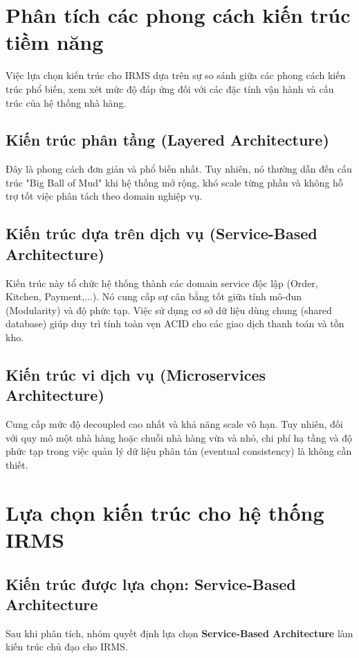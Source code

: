 \section{Phân tích các phong cách kiến trúc tiềm năng}

Việc lựa chọn kiến trúc cho IRMS dựa trên sự so sánh giữa các phong cách kiến trúc phổ biến, xem xét mức độ đáp ứng đối với các đặc tính vận hành và cấu trúc của hệ thống nhà hàng.

\subsection{Kiến trúc phân tầng (Layered Architecture)}
Đây là phong cách đơn giản và phổ biến nhất. Tuy nhiên, nó thường dẫn đến cấu trúc "Big Ball of Mud" khi hệ thống mở rộng, khó scale từng phần và không hỗ trợ tốt việc phân tách theo domain nghiệp vụ.

\subsection{Kiến trúc dựa trên dịch vụ (Service-Based Architecture)}
Kiến trúc này tổ chức hệ thống thành các domain service độc lập (Order, Kitchen, Payment,...). Nó cung cấp sự cân bằng tốt giữa tính mô-đun (Modularity) và độ phức tạp. Việc sử dụng cơ sở dữ liệu dùng chung (shared database) giúp duy trì tính toàn vẹn ACID cho các giao dịch thanh toán và tồn kho.

\subsection{Kiến trúc vi dịch vụ (Microservices Architecture)}
Cung cấp mức độ decoupled cao nhất và khả năng scale vô hạn. Tuy nhiên, đối với quy mô một nhà hàng hoặc chuỗi nhà hàng vừa và nhỏ, chi phí hạ tầng và độ phức tạp trong việc quản lý dữ liệu phân tán (eventual consistency) là không cần thiết.

\section{Lựa chọn kiến trúc cho hệ thống IRMS}

\subsection{Kiến trúc được lựa chọn: Service-Based Architecture}
Sau khi phân tích, nhóm quyết định lựa chọn \textbf{Service-Based Architecture} làm kiến trúc chủ đạo cho IRMS.

